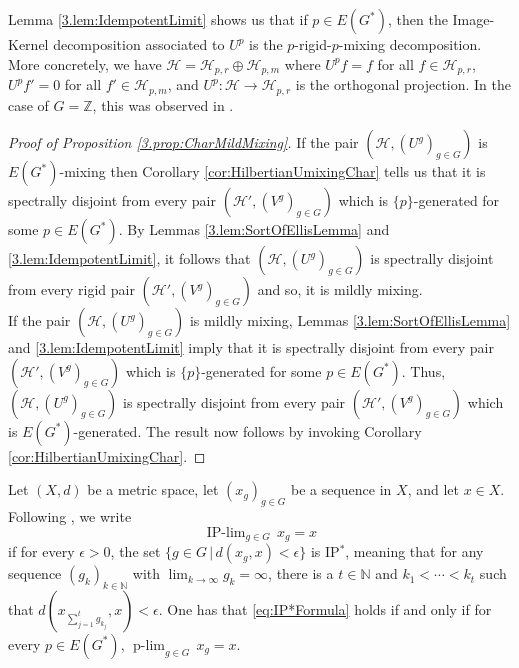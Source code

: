 \documentclass[graybox]{svmult}
\theoremstyle{definition}
\newcommand{\N}{\mathbb{N}}
\newcommand{\plimgG}[3]{\mathop {#1\text{-lim}}_{#2\in #3}\,}
\begin{document}
\begin{remark}\label{3.rem:prigidpmixingdecomposition}
    Lemma \ref{3.lem:IdempotentLimit} shows us that if $p \in E(G^*)$, then the Image-Kernel decomposition associated to $U^p$ is the $p$-rigid-$p$-mixing decomposition.
    More concretely, we have $\mathcal{H} = \mathcal{H}_{p,r}\oplus\mathcal{H}_{p,m}$ where $U^pf = f$ for all $f \in \mathcal{H}_{p,r}$, $U^pf' = 0$ for all $f' \in \mathcal{H}_{p,m}$, and $U^p:\mathcal{H}\rightarrow\mathcal{H}_{p,r}$ is the orthogonal projection.
    In the case of $G = \mathbb{Z}$, this was observed in \cite[Proposition 1.7]{PolynomialActionsOfUnitaryOperators}.
\end{remark}
\begin{proof}[Proof of Proposition \ref{3.prop:CharMildMixing}]
If the pair $(\mathcal H,(U^g)_{g\in G})$ is $E(G^*)$-mixing then Corollary \ref{cor:HilbertianUmixingChar} tells us that it is spectrally disjoint from every pair $(\mathcal H',(V^g)_{g\in G})$ which is $\{p\}$-generated for some $p\in E(G^*)$.
By Lemmas \ref{3.lem:SortOfEllisLemma} and \ref{3.lem:IdempotentLimit}, it follows that $(\mathcal H,(U^g)_{g\in G})$ is spectrally disjoint from every rigid pair $(\mathcal H',(V^g)_{g\in G})$ and so, it is mildly mixing.\\
If the pair $(\mathcal H,(U^g)_{g\in G})$ is mildly mixing, Lemmas \ref{3.lem:SortOfEllisLemma} and \ref{3.lem:IdempotentLimit} imply that it is spectrally disjoint from every pair $(\mathcal H',(V^g)_{g\in G})$ which is $\{p\}$-generated for some $p\in E(G^*)$. 
Thus, $(\mathcal H,(U^g)_{g\in G})$ is spectrally disjoint from every pair  $(\mathcal H',(V^g)_{g\in G})$ which is $E(G^*)$-generated. 
The result now follows by invoking Corollary \ref{cor:HilbertianUmixingChar}.
\end{proof}
\begin{remark}
    Let $(X,d)$ be a metric space, let $(x_g)_{g\in G}$ be a sequence in $X$, and let $x\in X$.
    Following \cite[Definition 9.2]{FBook}, we write
    \begin{equation}\label{eq:IP*Formula}
\mathop{\text{IP$^*$-lim}}_{g\in G}\,x_g=x
    \end{equation}
    if for every $\epsilon>0$, the set $\{g\in G\,|\,d(x_g,x)<\epsilon\}$ is IP$^*$, meaning that for any sequence $(g_k)_{k\in\N}$ with $\lim_{k\rightarrow\infty}g_k=\infty$, there is a $t\in\N$ and $k_1<\cdots<k_t$ such that $d(x_{\sum_{j=1}^t g_{k_j}},x)<\epsilon$.
    One has that \eqref{eq:IP*Formula} holds if and only if for every $p\in E(G^*)$, $\plimgG{p}{g}{G}x_g=x$.
\end{remark}
\end{document}
